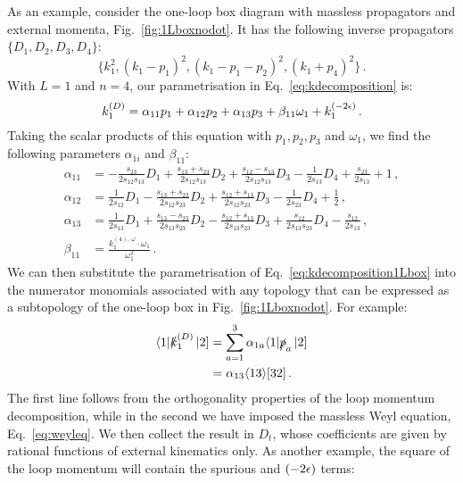 \documentclass[main.tex]{subfiles}
\begin{document}
As an example, consider the one-loop box diagram with massless propagators and external momenta, Fig.~\ref{fig:1Lboxnodot}. It has the following inverse propagators $\{D_1, D_2, D_3, D_4\}$:
\begin{equation} \label{eq:box1Lprops}
    \{k_1^2, (k_1-p_1)^2, (k_1-p_1-p_2)^2, (k_1+p_4)^2 \} \,.
\end{equation}
With $L=1$ and $n=4$, our parametrisation in Eq.~\ref{eq:kdecomposition} is:
\begin{equation} \label{eq:kdecomposition1Lbox}
    k_1^{(D)} = \alpha_{11} p_1 + \alpha_{12} p_2 + \alpha_{13} p_3 + \beta_{11} \omega_1 + k_1^{(-2\epsilon)}\,.
\end{equation}
Taking the scalar products of this equation with $p_1, p_2, p_3$ and $\omega_1$, we find the following parameters $\alpha_{1i}$ and $\beta_{11}$:
\begin{align}
    \alpha_{11} &= -\frac{s_{23}}{2 s_{12} s_{13}}D_1 +\frac{s_{13}+s_{23}}{2 s_{12} s_{13}}D_2 + \frac{s_{12}-s_{13}}{2 s_{12} s_{13}}D_3 -\frac{1}{2 s_{13}}D_4 +\frac{s_{23}}{2 s_{13}} + 1\,, \nonumber \\
    \alpha_{12} &= \frac{1}{2 s_{12}}D_1 -\frac{s_{13}+s_{23}}{2 s_{12} s_{23}}D_2 + \frac{s_{12}+s_{13}}{2 s_{12} s_{23}}D_3 -\frac{1}{2 s_{23}} D_4 +\frac{1}{2}\,, \nonumber \\
    \alpha_{13} &= \frac{1}{2 s_{13}}D_1 +\frac{s_{13}-s_{23}}{2 s_{13} s_{23}}D_2 - \frac{s_{12}+s_{13}}{2 s_{13} s_{23}}D_3 +\frac{s_{12}}{2 s_{13} s_{23}} D_4 -\frac{s_{12}}{2 s_{13}}\,, \nonumber \\
    \beta_{11} &= \frac{k_1^{(4),\, \omega} \cdot \omega_1}{\omega_1^2}\,.
\end{align}
We can then substitute the parametrisation of Eq.~\ref{eq:kdecomposition1Lbox} into the numerator monomials associated with any topology that can be expressed as a subtopology of the one-loop box in Fig.~\ref{fig:1Lboxnodot}. For example:
\begin{align}
    \langle 1|\slashed{k}_1^{(D)}\left| 2 \right] &= \sum_{a=1}^3 \alpha_{1a} \langle 1|\slashed{p}_a\left| 2 \right] \nonumber \\
    &= \alpha_{13} \langle 13 \rangle[ 32 ] \,.
\end{align}
The first line follows from the orthogonality properties of the loop momentum decomposition, while in the second we have imposed the massless Weyl equation, Eq.~\ref{eq:weyleq}. We then collect the result in $D_t$, whose coefficients are given by rational functions of external kinematics only. As another example, the square of the loop momentum will contain the spurious and $(-2\epsilon)$ terms:
\end{document}
